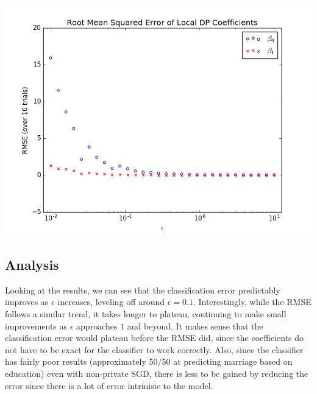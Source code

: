 \documentclass[12pt]{article}
\begin{document}
\includegraphics[scale=0.7]{rmse.png}

\subsection{Analysis}

\noindent

Looking at the results, we can see that the classification error predictably improves as $\epsilon$ increases, leveling off around $\epsilon = 0.1$. Interestingly, while the RMSE follows a similar trend, it takes longer to plateau, continuing to make small improvements as $\epsilon$ approaches $1$ and beyond. It makes sense that the classification error would plateau before the RMSE did, since the coefficients do not have to be exact for the classifier to work correctly. Also, since the classifier has fairly poor results (approximately 50/50 at predicting marriage based on education) even with non-private SGD, there is less to be gained by reducing the error since there is a lot of error intrinisic to the model.

\newpage
\end{document}
